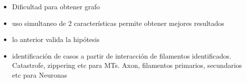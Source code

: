 \begin{conclusion}
\label{chap:conclu}
\begin{itemize}
    \item Dificultad para obtener grafo
    \item uso simultaneo de 2 caracter\'isticas permite obtener mejores resultados
    \item lo anterior valida la hip\'otesis
    \item identificaci\'on de casos a partir de interacci\'on de filamentos identificados. Catastrofe, zippering etc para MTs. Axon, filamentos primarios, secundarios etc para Neuronas
\end{itemize}
\end{conclusion}
